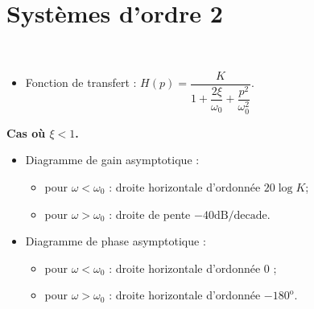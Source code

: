 \documentclass[10pt,fleqn]{article} %
\begin{document}
\vspace{-.5cm}

\section{Systèmes d'ordre 2}
\begin{resultat} ~\\

\vspace{-.5cm}

\noindent\begin{minipage}[c]{.53\linewidth}
\begin{itemize}
\item Fonction de transfert : $H(p)=\dfrac{K}{1+\dfrac{2\xi}{\omega_0}+\dfrac{p^2}{\omega_0^2}}$.
\end{itemize}
\begin{center}
\textbf{Cas où $\xi<1$.}
\end{center}
\begin{itemize}
\item Diagramme de gain asymptotique : 
\begin{itemize}
\item pour $\omega<\omega_0$ : droite horizontale d'ordonnée $20 \log K$;
\item pour $\omega>\omega_0$ : droite de pente $-{40}\text{dB/decade}$.
\end{itemize}
\item Diagramme de phase asymptotique : 
\begin{itemize}
\item pour $\omega<\omega_0$ : droite horizontale d'ordonnée 0 \degre;
\item pour $\omega>\omega_0$ : droite horizontale d'ordonnée $-180^{\text{o}}$.
\end{itemize}
\end{itemize}
\end{minipage} \hfill
\begin{minipage}[c]{.45\linewidth}

\end{minipage}


\end{resultat}
\end{document}
